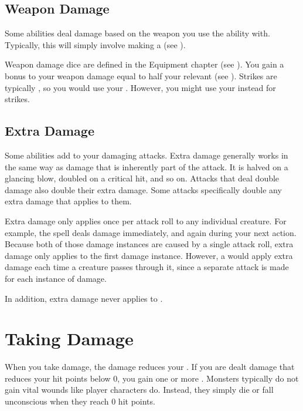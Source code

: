   \subsection{Weapon Damage}\label{Weapon Damage}
    Some abilities deal damage based on the weapon you use the ability with.
    Typically, this will simply involve making a  (see ).

    Weapon damage dice are defined in the Equipment chapter (see ).
    You gain a bonus to your weapon damage equal to half your relevant  (see ).
    Strikes are typically , so you would use your .
    However, you might use your  instead for \magical strikes.

  \subsection{Extra Damage}\label{Extra Damage}
    Some abilities add  to your damaging attacks.
    Extra damage generally works in the same way as damage that is inherently part of the attack.
    It is halved on a glancing blow, doubled on a critical hit, and so on.
    Attacks that deal double damage also double their extra damage.
    Some attacks specifically double any extra damage that applies to them.

    Extra damage only applies once per attack roll to any individual creature.
    For example, the  spell deals damage immediately, and again during your next action.
    Because both of those damage instances are caused by a single attack roll, extra damage only applies to the first damage instance.
    However, a  would apply extra damage each time a creature passes through it, since a separate attack is made for each instance of damage.

    In addition, extra damage never applies to .

\section{Taking Damage}\label{Taking Damage}
  When you take damage, the damage reduces your .
  If you are dealt damage that reduces your hit points below 0, you gain one or more .
  Monsters typically do not gain vital wounds like player characters do.
  Instead, they simply die or fall unconscious when they reach 0 hit points.


